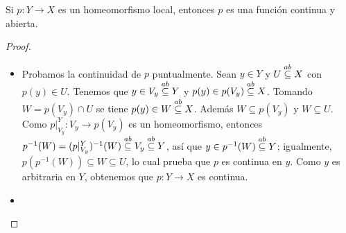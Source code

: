 \begin{Prop}
   Si $p:Y\to X$ es un homeomorfismo local, entonces $p$ es una función continua y abierta.
\end{Prop}
\begin{proof}
   \begin{itemize}
      \item Probamos la continuidad de $p$ puntualmente. Sean $y\in Y$ y $U\stackrel{ab}{\subseteq} X$ con $p(y)\in U$. Tenemos que $y\in V_y\stackrel{ab}{\subseteq} Y$ y $p(y)\in p(V_y)\stackrel{ab}{\subseteq} X$. Tomando $W=p(V_y)\cap U$ se tiene $p(y)\in W\stackrel{ab}{\subseteq} X$. Además $W\subseteq p(V_y)$ y $W\subseteq U$. Como $p|^{Y}_{V_y}:V_y\to p(V_y)$ es un homeomorfismo, entonces $p^{-1}(W)=(p|^{Y}_{V_y})^{-1}(W)\stackrel{ab}{\subseteq} V_y \stackrel{ab}{\subseteq} Y$, así que $y\in p^{-1}(W)\stackrel{ab}{\subseteq} Y$; igualmente, $p(p^{-1}(W))\subseteq W \subseteq U$, lo cual prueba que $p$ es continua en $y$. Como $y$ es arbitraria en $Y$, obtenemos que $p:Y\to X$ es continua.
      \item 
   \end{itemize}
\end{proof}
